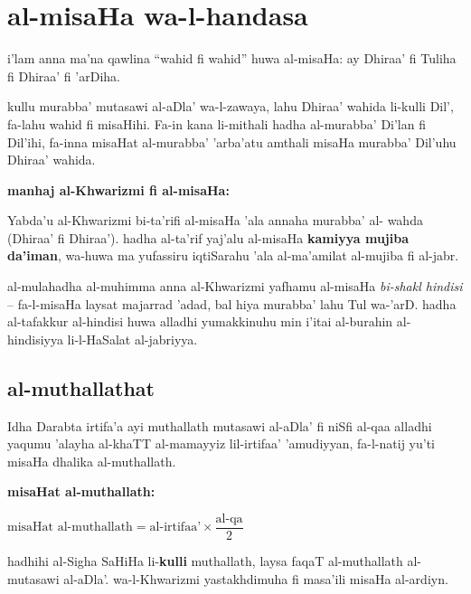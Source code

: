 \documentclass[11pt,a4paper]{book}
\begin{document}
\newpage

\chapter{al-misaHa wa-l-handasa}
\label{ch:mensuration}

\begin{originaltext}
i'lam anna ma'na qawlina ``wahid fi wahid'' huwa al-misaHa: ay
Dhiraa' fi Tuliha fi Dhiraa' fi 'arDiha.

kullu murabba' mutasawi al-aDla' wa-l-zawaya, lahu Dhiraa' wahida
li-kulli Dil', fa-lahu wahid fi misaHihi. Fa-in kana li-mithali
hadha al-murabba' Di'lan fi Dil'ihi, fa-inna misaHat al-murabba'
'arba'atu amthali misaHa murabba' Dil'uhu Dhiraa' wahida.
\end{originaltext}

\begin{commentary}
\textbf{manhaj al-Khwarizmi fi al-misaHa:}

Yabda'u al-Khwarizmi bi-ta'rifi al-misaHa 'ala annaha murabba' al-
wahda (Dhiraa' fi Dhiraa'). hadha al-ta'rif yaj'alu al-misaHa
\textbf{kamiyya mujiba da'iman}, wa-huwa ma yufassiru iqtiSarahu
'ala al-ma'amilat al-mujiba fi al-jabr.

al-mulahadha al-muhimma anna al-Khwarizmi yafhamu al-misaHa
\textit{bi-shakl hindisi} -- fa-l-misaHa laysat majarrad 'adad, bal
hiya murabba' lahu Tul wa-'arD. hadha al-tafakkur al-hindisi huwa
alladhi yumakkinuhu min i'itai al-burahin al-hindisiyya li-l-HaSalat
al-jabriyya.
\end{commentary}

\section{al-muthallathat}

\begin{originaltext}
Idha Darabta irtifa'a ayi muthallath mutasawi al-aDla' fi niSfi
al-qaa alladhi yaqumu 'alayha al-khaTT al-mamayyiz lil-irtifaa'
'amudiyyan, fa-l-natij yu'ti misaHa dhalika al-muthallath.
\end{originaltext}

\begin{mathexplain}
\textbf{misaHat al-muthallath:}

\begin{center}
$\text{misaHat al-muthallath} = \text{al-irtifaa'} \times \dfrac{\text{al-qa}}{2}$
\end{center}

hadhihi al-Sigha SaHiHa li-\textbf{kulli} muthallath, laysa faqaT
al-muthallath al-mutasawi al-aDla'. wa-l-Khwarizmi yastakhdimuha
fi masa'ili misaHa al-ardiyn.
\end{mathexplain}
\end{document}

